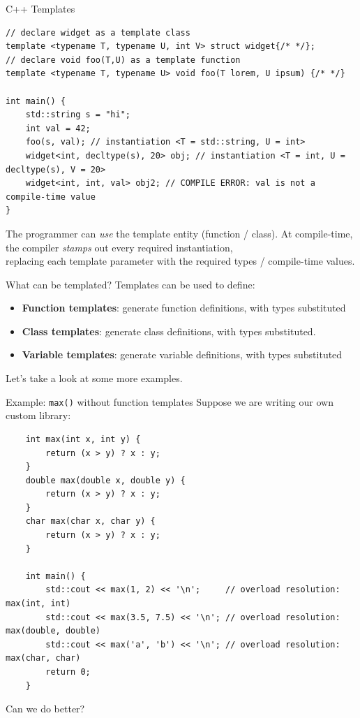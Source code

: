 \begin{frame}[fragile]{C++ Templates}
  \begin{verbatim}
// declare widget as a template class
template <typename T, typename U, int V> struct widget{/* */};
// declare void foo(T,U) as a template function
template <typename T, typename U> void foo(T lorem, U ipsum) {/* */}

int main() {
    std::string s = "hi";
    int val = 42;
    foo(s, val); // instantiation <T = std::string, U = int>
    widget<int, decltype(s), 20> obj; // instantiation <T = int, U = decltype(s), V = 20>
    widget<int, int, val> obj2; // COMPILE ERROR: val is not a compile-time value
}
  \end{verbatim}

  \begin{sqt:result}
    The programmer can \emph{use} the template entity (function / class).
    At compile-time, the compiler \emph{stamps} out every required instantiation, \\
    replacing each template parameter with the required types / compile-time values.
  \end{sqt:result}
\end{frame}

\begin{frame}[fragile]{What can be templated?}
  Templates can be used to define:
  \begin{itemize}
    \item \textbf{Function templates}: generate function definitions, with types substituted
    \item \textbf{Class templates}: generate class definitions, with types substituted.
    \item \textbf{Variable templates}: generate variable definitions, with types substituted
  \end{itemize}

  Let's take a look at some more examples.
\end{frame}

\begin{frame}[fragile]{Example: \texttt{max()} without function templates}
  Suppose we are writing our own custom  library:
  \begin{verbatim}
    int max(int x, int y) {
        return (x > y) ? x : y;
    }
    double max(double x, double y) {
        return (x > y) ? x : y;
    }
    char max(char x, char y) {
        return (x > y) ? x : y;
    }

    int main() {
        std::cout << max(1, 2) << '\n';     // overload resolution: max(int, int)
        std::cout << max(3.5, 7.5) << '\n'; // overload resolution: max(double, double)
        std::cout << max('a', 'b') << '\n'; // overload resolution: max(char, char)
        return 0;
    }
  \end{verbatim}

  Can we do better?
\end{frame}

